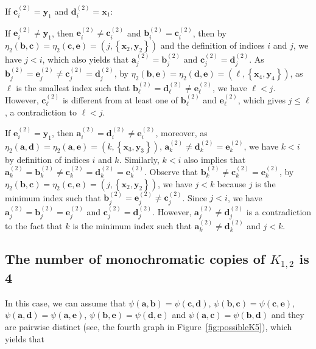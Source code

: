 \documentclass[11pt]{article}
\theoremstyle{definition}
\newcommand{\aaa}{\boldsymbol{a}}
\newcommand{\bb}{\boldsymbol{b}}
\newcommand{\cc}{\boldsymbol{c}}
\newcommand{\dd}{\boldsymbol{d}}
\newcommand{\ee}{\boldsymbol{e}}
\begin{document}
\begin{Case}
    \item If $\cc_{i}^{(2)}=\boldsymbol{y}_{1}$ and $\dd_{i}^{(2)}=\boldsymbol{x}_{1}$:
    \begin{Case}
        \item If $\ee_{i}^{(2)}\neq\boldsymbol{y}_{1}$, then $\ee_{i}^{(2)}\neq\cc_{i}^{(2)}$ and $\bb_{i}^{(2)}=\cc_{i}^{(2)}$, then by $\eta_{2}(\bb,\cc)=\eta_{2}(\cc,\ee)=(j,\left\{\boldsymbol{x}_{2},\boldsymbol{y}_{2}\right\})$ and the definition of indices $i$ and $j$, we have $j<i$, which also yields that $\aaa_{j}^{(2)}=\bb_{j}^{(2)}$ and $\cc_{j}^{(2)}=\dd_{j}^{(2)}$. As $\bb_{j}^{(2)}=\ee_{j}^{(2)}\neq\cc_{j}^{(2)}=\dd_{j}^{(2)}$, by $\eta_{2}(\bb,\ee)=\eta_{2}(\dd,\ee)=(\ell,\left\{\boldsymbol{x}_{4},\boldsymbol{y}_{4}\right\})$, as $\ell$ is the smallest index such that $\bb_{\ell}^{(2)}=\dd_{\ell}^{(2)}\neq \ee_{\ell}^{(2)}$, we have $\ell<j$. However, $\cc_{\ell}^{(2)}$ is different from at least one of $\bb_{\ell}^{(2)}$ and $\ee_{\ell}^{(2)}$, which gives $j\le \ell$, a contradiction to $\ell<j$.
        
        \item If $\ee_{i}^{(2)}=\boldsymbol{y}_{1}$, then $\aaa_{i}^{(2)}=\dd_{i}^{(2)}\neq \ee_{i}^{(2)}$, moreover, as $\eta_{2}(\aaa,\dd)=\eta_{2}(\aaa,\ee)=(k,\left\{\boldsymbol{x}_{3},\boldsymbol{y}_{3}\right\})$, $\aaa_{k}^{(2)}\neq\dd_{k}^{(2)}=\ee_{k}^{(2)}$, we have $k<i$ by definition of indices $i$ and $k$. Similarly, $k<i$ also implies that $\aaa_{k}^{(2)}=\bb_{k}^{(2)}\neq \cc_{k}^{(2)}=\dd_{k}^{(2)}=\ee_{k}^{(2)}$. Observe that $\bb_{k}^{(2)}\neq\cc_{k}^{(2)}=\ee_{k}^{(2)}$, by $\eta_{2}(\bb,\cc)=\eta_{2}(\cc,\ee)=(j,\left\{\boldsymbol{x}_{2},\boldsymbol{y}_{2}\right\})$, we have $j<k$ because $j$ is the minimum index such that $\bb_{j}^{(2)}=\ee_{j}^{(2)}\neq\cc_{j}^{(2)}$. Since $j<i$, we have $\aaa_{j}^{(2)}=\bb_{j}^{(2)}=\ee_{j}^{(2)}$ and $\cc_{j}^{(2)}=\dd_{j}^{(2)}$. However, $\aaa_{j}^{(2)}\neq\dd_{j}^{(2)}$ is a contradiction to the fact that $k$ is the minimum index such that $\aaa_{k}^{(2)}\neq\dd_{k}^{(2)}$ and $j<k$.
    \end{Case}
\end{Case}


\subsection{The number of monochromatic copies of $K_{1,2}$ is 4}\label{subsubsec:star4}

In this case, we can assume that $\psi(\aaa,\bb)=\psi(\cc,\dd)$, $\psi(\bb,\cc)=\psi(\cc,\ee)$, $\psi(\aaa,\dd)=\psi(\aaa,\ee)$, $\psi(\bb,\ee)=\psi(\dd,\ee)$ and $\psi(\aaa,\cc)=\psi(\bb,\dd)$ and they are pairwise distinct (see, the fourth graph in Figure~\ref{fig:possibleK5}), which yields that
\end{document}
